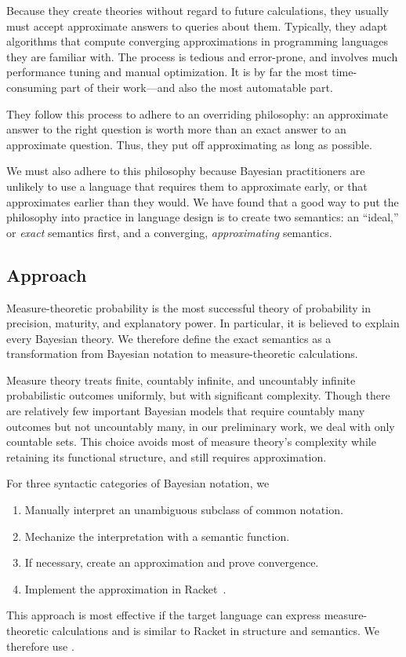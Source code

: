 Because they create theories without regard to future calculations, they usually must accept approximate answers to queries about them. Typically, they adapt algorithms that compute converging approximations in programming languages they are familiar with. The process is tedious and error-prone, and involves much performance tuning and manual optimization. It is by far the most time-consuming part of their work---and also the most automatable part.

They follow this process to adhere to an overriding philosophy: an approximate answer to the right question is worth more than an exact answer to an approximate question. Thus, they put off approximating as long as possible.

We must also adhere to this philosophy because Bayesian practitioners are unlikely to use a language that requires them to approximate early, or that approximates earlier than they would. We have found that a good way to put the philosophy into practice in language design is to create two semantics: an ``ideal,'' or \textit{exact} semantics first, and a converging, \textit{approximating} semantics.

\subsection{Approach}

Measure-theoretic probability is the most successful theory of probability in precision, maturity, and explanatory power. In particular, it is believed to explain every Bayesian theory. We therefore define the exact semantics as a transformation from Bayesian notation to measure-theoretic calculations.

Measure theory treats finite, countably infinite, and uncountably infinite probabilistic outcomes uniformly, but with significant complexity. Though there are relatively few important Bayesian models that require countably many outcomes but not uncountably many, in our preliminary work, we deal with only countable sets. This choice avoids most of measure theory's complexity while retaining its functional structure, and still requires approximation.

For three syntactic categories of Bayesian notation, we
\begin{enumerate}
	\item Manually interpret an unambiguous subclass of common notation.
	\item Mechanize the interpretation with a semantic function.
	\item If necessary, create an approximation and prove convergence.
	\item Implement the approximation in Racket~\cite{cit:racket-lang}.
\end{enumerate}
This approach is most effective if the target language can express measure-theoretic calculations and is similar to Racket in structure and semantics. We therefore use \targetlang.

